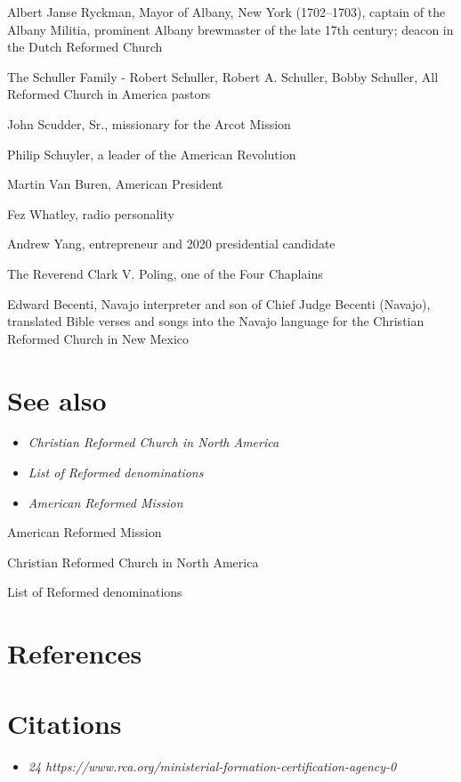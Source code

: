 Albert Janse Ryckman, Mayor of Albany, New York (1702--1703), captain of
the Albany Militia, prominent Albany brewmaster of the late 17th
century; deacon in the Dutch Reformed Church

The Schuller Family - Robert Schuller, Robert A. Schuller, Bobby
Schuller, All Reformed Church in America pastors

John Scudder, Sr., missionary for the Arcot Mission

Philip Schuyler, a leader of the American Revolution

Martin Van Buren, American President

Fez Whatley, radio personality

Andrew Yang, entrepreneur and 2020 presidential candidate

The Reverend Clark V. Poling, one of the Four Chaplains

Edward Becenti, Navajo interpreter and son of Chief Judge Becenti
(Navajo), translated Bible verses and songs into the Navajo language for
the Christian Reformed Church in New Mexico

\section{See also}\label{see-also}

\begin{itemize}
\item
  \emph{Christian Reformed Church in North America}
\item
  \emph{List of Reformed denominations}
\item
  \emph{American Reformed Mission}
\end{itemize}

American Reformed Mission

Christian Reformed Church in North America

List of Reformed denominations

\section{References}\label{references}

\section{Citations}\label{citations}

\begin{itemize}
\item
  \emph{24
  https://www.rca.org/ministerial-formation-certification-agency-0}
\end{itemize}

